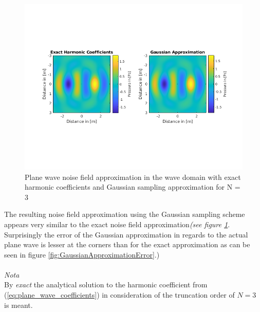 \begin{figure}[H]
    \centerline{\includegraphics[width=180mm,keepaspectratio]{LaTeX/images/plots/Gauss_Approximation.png}}
    \caption{Plane wave noise field approximation in the wave domain with exact harmonic coefficients and Gaussian sampling approximation for N = 3}
    \label{fig:GaussianApproximation}
\end{figure}


The resulting noise field approximation using the Gaussian sampling scheme appears very similar to the exact noise field approximation\textit{(see figure \ref{fig:GaussianApproximation}}.\\
Surprisingly the error of the Gaussian approximation in regards to the actual plane wave is lesser at the corners than for the exact approximation as can be seen in figure \ref{fig:GaussianApproximationError}.)\\\\

\textit{Nota}\\
By \textit{exact} the analytical solution to the harmonic coefficient from (\ref{eq:plane_wave_coefficients}) in consideration of the truncation order of $N = 3$ is meant. 


